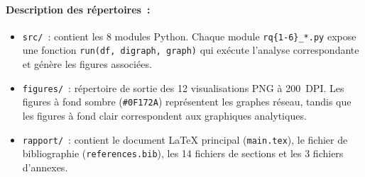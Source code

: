 \paragraph{Description des r\'epertoires~:}
\begin{itemize}
  \item \texttt{src/}~: contient les 8 modules Python. Chaque module \texttt{rq\{1-6\}\_*.py} expose une fonction \texttt{run(df, digraph, graph)} qui ex\'ecute l'analyse correspondante et g\'en\`ere les figures associ\'ees.
  \item \texttt{figures/}~: r\'epertoire de sortie des 12 visualisations PNG \`a 200~DPI. Les figures \`a fond sombre (\texttt{\#0F172A}) repr\'esentent les graphes r\'eseau, tandis que les figures \`a fond clair correspondent aux graphiques analytiques.
  \item \texttt{rapport/}~: contient le document LaTeX principal (\texttt{main.tex}), le fichier de bibliographie (\texttt{references.bib}), les 14 fichiers de sections et les 3 fichiers d'annexes.
\end{itemize}
